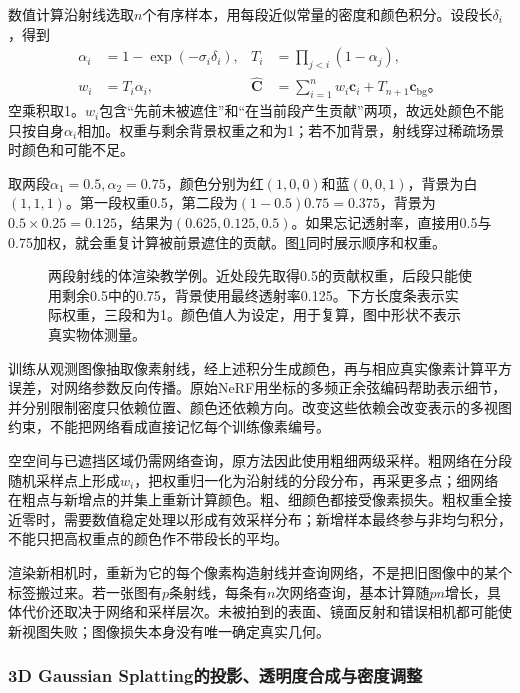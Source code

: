 数值计算沿射线选取$n$个有序样本，用每段近似常量的密度和颜色积分。设段长$\delta_i$，得到
\begin{equation}
 \begin{aligned}
 \alpha_i&=1-\exp(-\sigma_i\delta_i),&
 T_i&=\prod_{j<i}(1-\alpha_j),\\
 w_i&=T_i\alpha_i,&
 \widehat{\bm{C}}&=\sum_{i=1}^{n}w_i\bm{c}_i
       +T_{n+1}\bm{c}_{\mathrm{bg}}\text{。}
 \end{aligned}
 \label{eq:vision-nerf-discrete}
\end{equation}
空乘积取1。$w_i$包含“先前未被遮住”和“在当前段产生贡献”两项，故远处颜色不能只按自身$\alpha_i$相加。权重与剩余背景权重之和为1；若不加背景，射线穿过稀疏场景时颜色和可能不足。

取两段$\alpha_1=0.5,\alpha_2=0.75$，颜色分别为红$(1,0,0)$和蓝$(0,0,1)$，背景为白$(1,1,1)$。第一段权重0.5，第二段为$(1-0.5)0.75=0.375$，背景为$0.5\times0.25=0.125$，结果为$(0.625,0.125,0.5)$。如果忘记透射率，直接用0.5与0.75加权，就会重复计算被前景遮住的贡献。图\ref{fig:vision-ray-compositing}同时展示顺序和权重。

\begin{figure}[htbp]
 \centering
 
 \caption{两段射线的体渲染教学例。近处段先取得0.5的贡献权重，后段只能使用剩余0.5中的0.75，背景使用最终透射率0.125。下方长度条表示实际权重，三段和为1。颜色值人为设定，用于复算，图中形状不表示真实物体测量。}
 \label{fig:vision-ray-compositing}
\end{figure}

训练从观测图像抽取像素射线，经上述积分生成颜色，再与相应真实像素计算平方误差，对网络参数反向传播。原始NeRF用坐标的多频正余弦编码帮助表示细节，并分别限制密度只依赖位置、颜色还依赖方向。改变这些依赖会改变表示的多视图约束，不能把网络看成直接记忆每个训练像素编号。

空空间与已遮挡区域仍需网络查询，原方法因此使用粗细两级采样。粗网络在分段随机采样点上形成$w_i$，把权重归一化为沿射线的分段分布，再采更多点；细网络在粗点与新增点的并集上重新计算颜色。粗、细颜色都接受像素损失。粗权重全接近零时，需要数值稳定处理以形成有效采样分布；新增样本最终参与非均匀积分，不能只把高权重点的颜色作不带段长的平均。

渲染新相机时，重新为它的每个像素构造射线并查询网络，不是把旧图像中的某个标签搬过来。若一张图有$p$条射线，每条有$n$次网络查询，基本计算随$pn$增长，具体代价还取决于网络和采样层次。未被拍到的表面、镜面反射和错误相机都可能使新视图失败；图像损失本身没有唯一确定真实几何。

\subsubsection{3D Gaussian Splatting的投影、透明度合成与密度调整}
\label{sec:vision-generation-gaussians}

